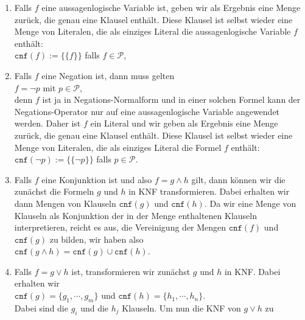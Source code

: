 \begin{enumerate}
\item Falls $f$ eine aussagenlogische Variable ist, geben wir als Ergebnis eine Menge zurück, die genau eine
      Klausel enthält.  Diese Klausel ist selbst wieder eine Menge von Literalen, die als einziges Literal die
      aussagenlogische Variable $f$ enthält:
      \\[0.2cm]
      \hspace*{1.3cm}
      $\texttt{cnf}(f) := \bigl\{\{f\}\bigr\}$ \quad falls $f \in \mathcal{P}$,
\item Falls $f$ eine Negation ist, dann muss gelten
      \\[0.2cm]
      \hspace*{1.3cm}
      $f = \neg p$ \quad mit $p \in \mathcal{P}$,
      \\[0.2cm]
      denn $f$ ist ja in Negations-Normalform und in einer solchen Formel kann der Negations-Operator nur auf
      eine aussagenlogische Variable angewendet werden.  Daher ist $f$ ein Literal und wir geben als Ergebnis
      eine Menge zurück, die genau eine Klausel enthält.  Diese Klausel ist selbst wieder eine Menge von
      Literalen, die als einziges Literal die Formel $f$ enthält:
      \\[0.2cm]
      \hspace*{1.3cm}
      $\texttt{cnf}(\neg p) := \bigl\{\{\neg p\}\bigr\}$ \quad falls $p \in \mathcal{P}$.
\item Falls $f$ eine Konjunktion ist und also $f = g \wedge h$ gilt,  dann können wir die 
      zunächst die Formeln $g$ und $h$ in KNF transformieren.  Dabei erhalten wir dann Mengen von Klauseln 
      $\texttt{cnf}(g)$ und $\texttt{cnf}(h)$.  Da wir eine Menge von Klauseln als Konjunktion der in der Menge
      enthaltenen Klauseln interpretieren, reicht es aus,  
      die Vereinigung der Mengen $\texttt{cnf}(f)$ und $\texttt{cnf}(g)$ zu bilden,
      wir haben also \\[0.2cm]
      \hspace*{1.3cm} $\texttt{cnf}(g \wedge h) = \texttt{cnf}(g) \cup  \texttt{cnf}(h)$.
\item Falls $f = g \vee h$ ist, transformieren wir zunächst $g$ und $h$ in KNF.
      Dabei erhalten wir \\[0.2cm]
      \hspace*{1.3cm} 
      $\texttt{cnf}(g) = \{ g_1, \cdots, g_m \}$ \quad und \quad
      $\texttt{cnf}(h) = \{ h_1, \cdots, h_n \}$. \\[0.2cm]
      Dabei sind die $g_i$ und die $h_j$ Klauseln.  Um nun die KNF von $g \vee h$ zu

\end{enumerate}
